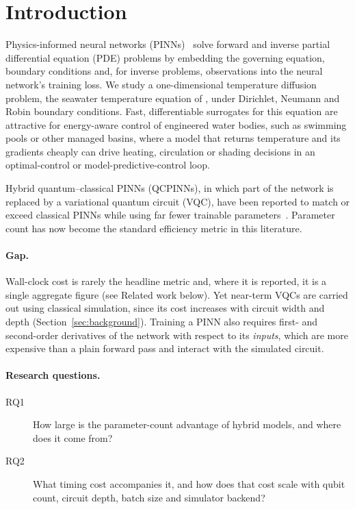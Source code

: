\section{Introduction}
\label{sec:intro}

Physics-informed neural networks (PINNs)~\cite{raissi2019} solve forward and inverse
partial differential equation (PDE) problems by embedding the governing equation, boundary
conditions and, for inverse problems, observations into the neural network's training loss.
We study a one-dimensional temperature diffusion problem, the seawater temperature equation of
\citet{han2026}, under Dirichlet, Neumann and Robin boundary conditions.
Fast, differentiable surrogates for this equation are attractive for energy-aware control of
engineered water bodies, such as swimming pools or other managed basins, where a model that
returns temperature and its gradients cheaply can drive heating, circulation or shading decisions
in an optimal-control or model-predictive-control loop.

Hybrid quantum--classical PINNs (QCPINNs), in which part of the network is replaced by a variational
quantum circuit (VQC), have been reported to match or exceed classical PINNs while using far fewer
trainable parameters~\cite{farea2025}. Parameter count has now become the standard efficiency metric
in this literature.

\paragraph{Gap.} Wall-clock cost is rarely the headline metric and, where it is reported, it is a
single aggregate figure (see Related work below). Yet near-term VQCs are carried out using classical
simulation, since its cost increases with circuit width and depth (Section~\ref{sec:background}).
Training a PINN also requires first- and second-order derivatives of the network with respect to its
\emph{inputs}, which are more expensive than a plain forward pass and interact with the simulated
circuit.

\paragraph{Research questions.}
\begin{description}
  \item[RQ1] How large is the parameter-count advantage of hybrid models, and where does it come from?
  \item[RQ2] What timing cost accompanies it, and how does that cost scale with qubit count, circuit
  depth, batch size and simulator backend?
\end{description}

